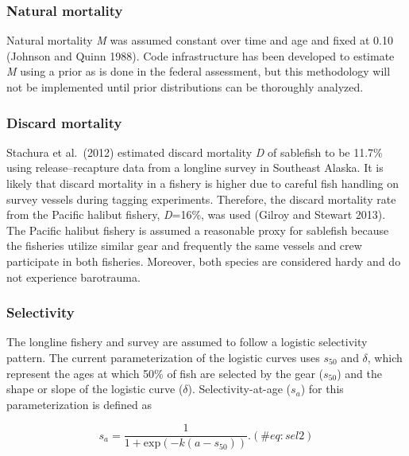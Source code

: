 \documentclass[
]{article}
\begin{document}
\hypertarget{natural-mortality}{%
\subsubsection{Natural mortality}\label{natural-mortality}}

Natural mortality \emph{M} was assumed constant over time and age and
fixed at 0.10 (Johnson and Quinn 1988). Code infrastructure has been
developed to estimate \emph{M} using a prior as is done in the federal
assessment, but this methodology will not be implemented until prior
distributions can be thoroughly analyzed.

\hypertarget{discard-mortality}{%
\subsubsection{Discard mortality}\label{discard-mortality}}

Stachura et al.~(2012) estimated discard mortality \emph{D} of sablefish
to be 11.7\% using release--recapture data from a longline survey in
Southeast Alaska. It is likely that discard mortality in a fishery is
higher due to careful fish handling on survey vessels during tagging
experiments. Therefore, the discard mortality rate from the Pacific
halibut fishery, \emph{D}=16\%, was used (Gilroy and Stewart 2013). The
Pacific halibut fishery is assumed a reasonable proxy for sablefish
because the fisheries utilize similar gear and frequently the same
vessels and crew participate in both fisheries. Moreover, both species
are considered hardy and do not experience barotrauma.

\hypertarget{selectivity}{%
\subsubsection{Selectivity}\label{selectivity}}

The longline fishery and survey are assumed to follow a logistic
selectivity pattern. The current parameterization of the logistic curves
uses \emph{\(s_{50}\)} and \emph{\(\delta\)}, which represent the ages
at which 50\% of fish are selected by the gear (\emph{\(s_{50}\)}) and
the shape or slope of the logistic curve (\emph{\(\delta\)}).
Selectivity-at-age (\emph{\(s_a\)}) for this parameterization is defined
as

\[
\begin{equation}
s_a=\frac{1}{1+\mbox{exp}(-k(a-s_{50}))}.
(\#eq:sel2)
\end{equation}
\]
\end{document}
